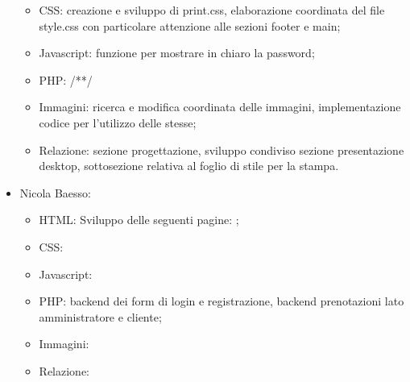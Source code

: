 \documentclass[]{article}
\begin{document}
\begin{itemize}
\begin{itemize}
		\item CSS: creazione e sviluppo di print.css, elaborazione coordinata del file style.css con particolare attenzione alle sezioni footer e main;
		\item Javascript: funzione per mostrare in chiaro la password;
		\item PHP: /**/
		\item Immagini: ricerca e modifica coordinata delle immagini, implementazione codice per l'utilizzo delle stesse;
		\item Relazione: sezione progettazione, sviluppo condiviso sezione presentazione desktop, sottosezione relativa al foglio di stile per la stampa. 
	\end{itemize} 
	\item Nicola Baesso:
	\begin{itemize}
		\item HTML: Sviluppo delle seguenti pagine: ;
		\item CSS:
		\item Javascript:
		\item PHP: backend dei form di login e registrazione, backend prenotazioni lato amministratore e cliente;
		\item Immagini:
		\item Relazione:
	\end{itemize} 
\end{itemize}
\end{document}
